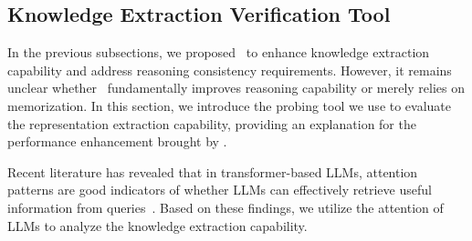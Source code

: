 
\subsection{Knowledge Extraction Verification Tool}
\label{subsection: probing}
In the previous subsections, we proposed \method\ to enhance knowledge extraction capability and address reasoning consistency requirements.  
However, it remains unclear whether \method\ fundamentally improves reasoning capability or merely relies on memorization.  
In this section, we introduce the probing tool we use to evaluate the representation extraction capability, providing an explanation for the performance enhancement brought by \method.


Recent literature has revealed that in transformer-based LLMs, attention patterns are good indicators of whether LLMs can effectively retrieve useful information from queries~\citep{wang2024towards, hou2023towards}. Based on these findings, we utilize the attention of LLMs to analyze the knowledge extraction capability.

